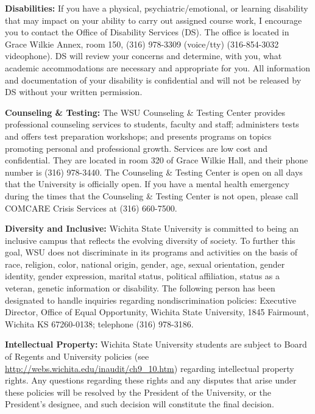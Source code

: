 \documentclass[11pt, a4paper]{article}
\begin{document}
\vspace*{.15in}
\noindent\textbf{Disabilities:}
If you have a physical, psychiatric/emotional, or learning disability that may impact on your ability to carry out assigned course work, I encourage you to contact the Office of Disability Services (DS).
The office is located in Grace Wilkie Annex, room 150, (316) 978-3309 (voice/tty) (316-854-3032 videophone). DS will review your concerns and determine, with you, what academic accommodations are necessary and appropriate for you. All information and documentation of your disability is confidential and will not be released by DS without your written permission.

\vspace*{.15in}
\noindent\textbf{Counseling \& Testing:}
The WSU Counseling \& Testing Center provides professional counseling services to students, faculty and staff; administers tests and offers test preparation workshops; and presents programs on topics promoting personal and professional growth. Services are low cost and confidential. They are located in room 320 of Grace Wilkie Hall, and their phone number is (316) 978-3440. The Counseling \& Testing Center is open on all days that the University is officially open. If you have a mental health emergency during the times that the Counseling \& Testing Center is not open, please call COMCARE Crisis Services at (316) 660-7500.

\vspace*{.15in}
\noindent\textbf{Diversity and Inclusive:}
Wichita State University is committed to being an inclusive campus that reflects the evolving diversity of society. To further this goal, WSU does not discriminate in its programs and activities on the basis of race, religion, color, national origin, gender, age, sexual orientation, gender identity, gender expression, marital status, political affiliation, status as a veteran, genetic information or disability. The following person has been designated to handle inquiries regarding nondiscrimination policies: Executive Director, Office of Equal Opportunity, Wichita State University, 1845 Fairmount, Wichita KS 67260-0138; telephone (316) 978-3186.

\vspace*{.15in}
\noindent\textbf{Intellectual Property:}
Wichita State University students are subject to Board of Regents and University policies (see \url{http://webs.wichita.edu/inaudit/ch9_10.htm}) regarding intellectual property rights. Any questions regarding these rights and any disputes that arise under these policies will be resolved by the President of the University, or the President’s designee, and such decision will constitute the final decision.
\end{document}
